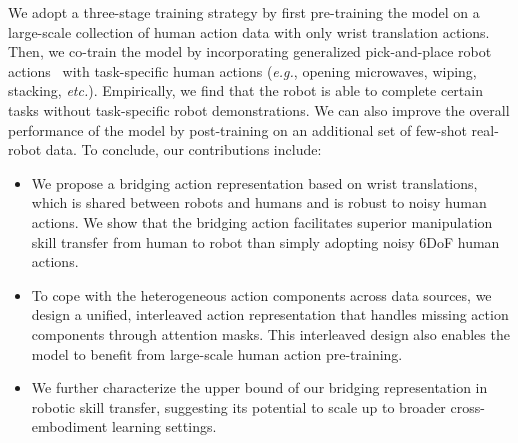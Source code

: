 We adopt a three-stage training strategy by first pre-training the model on a large-scale collection of human action data with only wrist translation actions.
% 
Then, we co-train the model by incorporating generalized pick-and-place robot actions~\cite{cheang2025gr3} with task-specific human actions (\textit{e.g.}, opening microwaves, wiping, stacking, \textit{etc.}).
% 
Empirically, we find that the robot is able to complete certain tasks without task-specific robot demonstrations.
% 
We can also improve the overall performance of the model by post-training on an additional set of few-shot real-robot data.
% 
To conclude, our contributions include:

\begin{itemize}
    \item We propose a bridging action representation based on wrist translations, which is shared between robots and humans and is robust to noisy human actions.
    We show that the bridging action facilitates superior manipulation skill transfer from human to robot than simply adopting noisy 6DoF human actions.

    \item To cope with the heterogeneous action components across data sources, we design a unified, interleaved action representation that handles missing action components through attention masks.
    This interleaved design also enables the model to benefit from large-scale human action pre-training.

    \item We further characterize the upper bound of our bridging representation in robotic skill transfer, suggesting its potential to scale up to broader cross-embodiment learning settings.
\end{itemize}
